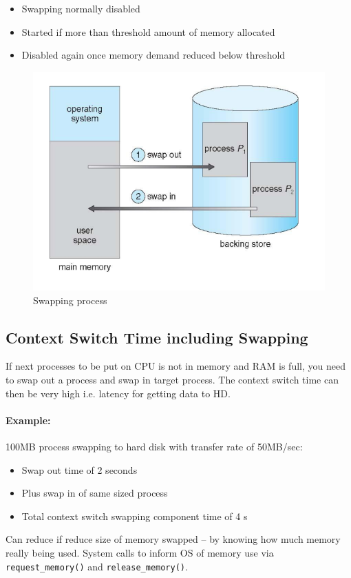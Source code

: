 \begin{itemize}
    \item Swapping normally disabled
    \item Started if more than threshold amount of memory allocated
    \item Disabled again once memory demand reduced below threshold
\end{itemize}

\begin{figure}[h!]
    \centering
    \includegraphics[width=0.5\linewidth]{img/dfbngt.png}
    \caption{Swapping process}
\end{figure}


\newpage
\subsection{Context Switch Time including Swapping}

If next processes to be put on CPU is not in memory and RAM is full,
you need to swap out a process and swap in target process. The context switch time can then be very high i.e. latency for getting data to HD.

\paragraph{Example: } 100MB process swapping to hard disk with transfer rate of 50MB/sec:

\begin{itemize}
    \item[] Swap out time of 2 seconds
    \item[] Plus swap in of same sized process
    \item[] Total context switch swapping component time of 4 s
\end{itemize}

Can reduce if reduce size of memory swapped – by knowing how
much memory really being used. System calls to inform OS of memory use via
\verb|request_memory()| and \verb|release_memory()|.

